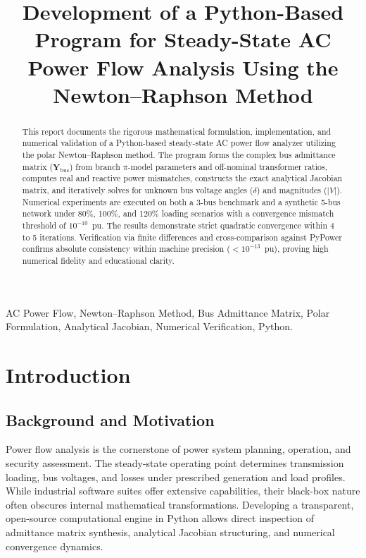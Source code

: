 ﻿\documentclass[conference,10pt]{IEEEtran}
\begin{document}
\title{Development of a Python-Based Program for Steady-State AC Power Flow Analysis Using the Newton--Raphson Method}

\author{
}

\maketitle

\begin{abstract}
This report documents the rigorous mathematical formulation, implementation, and numerical validation of a Python-based steady-state AC power flow analyzer utilizing the polar Newton--Raphson method. The program forms the complex bus admittance matrix ($\mathbf{Y}_{\text{bus}}$) from branch $\pi$-model parameters and off-nominal transformer ratios, computes real and reactive power mismatches, constructs the exact analytical Jacobian matrix, and iteratively solves for unknown bus voltage angles ($\delta$) and magnitudes ($|V|$). Numerical experiments are executed on both a 3-bus benchmark and a synthetic 5-bus network under 80\%, 100\%, and 120\% loading scenarios with a convergence mismatch threshold of $10^{-10}$~pu. The results demonstrate strict quadratic convergence within 4 to 5 iterations. Verification via finite differences and cross-comparison against PyPower confirms absolute consistency within machine precision ($< 10^{-13}$~pu), proving high numerical fidelity and educational clarity.
\end{abstract}

\begin{IEEEkeywords}
AC Power Flow, Newton--Raphson Method, Bus Admittance Matrix, Polar Formulation, Analytical Jacobian, Numerical Verification, Python.
\end{IEEEkeywords}

\section{Introduction}
\subsection{Background and Motivation}
Power flow analysis is the cornerstone of power system planning, operation, and security assessment. The steady-state operating point determines transmission loading, bus voltages, and losses under prescribed generation and load profiles. While industrial software suites offer extensive capabilities, their black-box nature often obscures internal mathematical transformations. Developing a transparent, open-source computational engine in Python allows direct inspection of admittance matrix synthesis, analytical Jacobian structuring, and numerical convergence dynamics.
\end{document}

